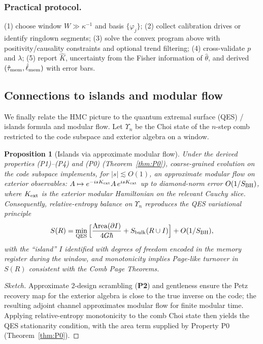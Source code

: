 \documentclass[11pt,a4paper]{article}
\newcommand{\Ptwo}{\textbf{P2}\xspace}
\newcommand{\HMC}{\textsc{HMC}\xspace}
\theoremstyle{plain}
\newtheorem{proposition}[theorem]{Proposition}
\theoremstyle{definition}
\theoremstyle{remark}
\begin{document}
\subsubsection{Practical protocol.} (1) choose window $W\gg \kappa^{-1}$ and basis $\{\varphi_j\}$; (2) collect calibration drives or
identify ringdown segments; (3) solve the convex program above with positivity/causality constraints and optional trend filtering;
(4) cross-validate $p$ and $\lambda$; (5) report $\hat K$, uncertainty from the Fisher information of $\hat\theta$, and derived
$(\hat\tau_{\rm mem},\hat\ell_{\rm mem})$ with error bars.

\subsection{Connections to islands and modular flow}
\label{sec:islands-modular}
We finally relate the \HMC{} picture to the quantum extremal surface (QES) / islands formula and modular flow.
Let $\Upsilon_{n}$ be the Choi state of the $n$-step comb restricted to the code subspace and exterior algebra on a window.
\begin{proposition}[Islands via approximate modular flow]\label{prop:islands-modular}
Under the derived properties (P1)--(P4) and (P0) (Theorem~\ref{thm:P0}), coarse-grained evolution on the code subspace implements, for $|s|\lesssim O(1)$,
an \emph{approximate modular flow} on exterior observables: $A\mapsto e^{-isK_{\rm ext}}A\,e^{isK_{\rm ext}}$ up to
diamond-norm error $O(1/S_{\rm BH})$, where $K_{\rm ext}$ is the exterior modular Hamiltonian on the relevant Cauchy slice.
Consequently, relative-entropy balance on $\Upsilon_{n}$ reproduces the QES variational principle
\begin{equation}
S(R)=\min_{\rm QES}\Big[\frac{{\rm Area}(\partial I)}{4G\hbar}+S_{\rm bulk}(R\cup I)\Big] + O(1/S_{\rm BH}),
\end{equation}
with the ``island'' $I$ identified with degrees of freedom encoded in the memory register during the window, and
monotonicity implies Page-like turnover in $S(R)$ consistent with the Comb Page Theorems.
\end{proposition}
\begin{proof}[Sketch]
Approximate $2$-design scrambling (\Ptwo) and gentleness ensure the Petz recovery map for the exterior algebra is close to the true
inverse on the code; the resulting adjoint channel approximates modular flow for finite modular time. Applying relative-entropy
monotonicity to the comb Choi state then yields the QES stationarity condition, with the area term supplied by Property P0 (Theorem~\ref{thm:P0}).
\end{proof}
\end{document}
